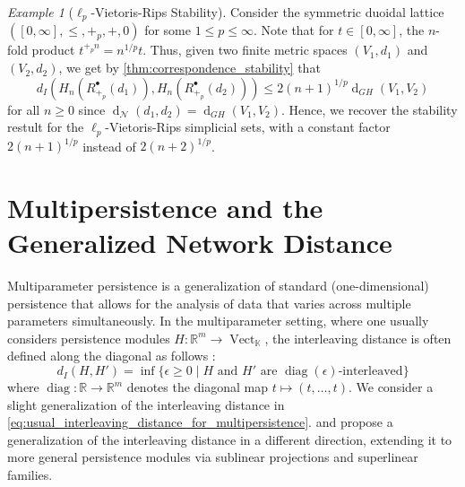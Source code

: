 \documentclass[a4paper,11pt]{article}
\DeclareMathOperator{\diag}{diag}
\newcounter{dummy}\numberwithin{dummy}{section}
\theoremstyle{remark}
\newtheorem{example}[dummy]{Example}
\begin{document}
\begin{example}[$\ell_p$-Vietoris-Rips Stability]\label{ex:ell_p_vietoris_rips_stability}
Consider the symmetric duoidal lattice $([0,\infty],\leq,+_p,+,0)$ for some $1\leq p\leq\infty$. Note that for $t\in [0,\infty]$, the $n$-fold product $t^{+_pn}=n^{1/p}t$. Thus, given two finite metric spaces $(V_1,d_1)$ and $(V_2,d_2)$, we get by \cref{thm:correspondence_stability} that
\begin{equation*}
d_I(H_n(R_{+_p}^\bullet(d_1)), H_n(R_{+_p}^\bullet(d_2))) \leq 2(n+1)^{1/p}\operatorname{d}_{GH}(V_1,V_2)
\end{equation*}
for all $n\geq 0$ since $\operatorname{d}_{\mathcal{N}}(d_1, d_2)=\operatorname{d}_{GH}(V_1,V_2)$. Hence, we recover the stability restult \cite[Corollary~4.3]{ivanov2024ell_p} for the $\ell_p$-Vietoris-Rips simplicial sets, with a constant factor $2(n+1)^{1/p}$ instead of $2(n+2)^{1/p}$.
\end{example}


\section{Multipersistence and the Generalized Network Distance}\label{sec:multipersistence}

Multiparameter persistence is a generalization of standard (one-dimensional) persistence that allows for the analysis of data that varies across multiple parameters simultaneously. In the multiparameter setting, where one usually considers persistence modules $H\colon\mathbb{R}^m\to\operatorname{Vect}_\mathbb{K}$, the interleaving distance is often defined along the diagonal as follows \cite{botnan2022introduction,bjerkevik2020computing,lesnick2015theory}:
\begin{equation}\label{eq:usual_interleaving_distance_for_multipersistence}
    d_I(H,H')=\inf\{\epsilon\geq0\mid H\text{ and } H'\text{ are }\diag(\epsilon)\text{-interleaved}\}
\end{equation}
where $\diag\colon\mathbb{R}\to\mathbb{R}^m$ denotes the diagonal map $t\mapsto(t,\ldots,t)$. We consider a slight generalization of the interleaving distance in \cref{eq:usual_interleaving_distance_for_multipersistence}. \cite{bubenik2015metrics} and \cite{de2017theory} propose a generalization of the interleaving distance in a different direction, extending it to more general persistence modules via sublinear projections and superlinear families.
\end{document}
